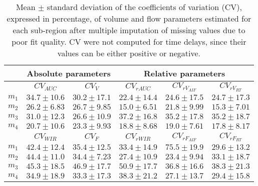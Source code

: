 \begin{table}
\begin{center}
\begin{tabular}{lccccc}
\toprule
& \multicolumn{2}{c}{Absolute parameters} & \multicolumn{3}{c}{Relative parameters} \\
\midrule
 & $CV_{AUC}$  & $CV_{V}$  & $CV_{rAUC}$  & $CV_{rV_{AIF}}$  & $CV_{rV_{RT}}$ \\
\midrule
$m_1$  	& $34.7 \pm 10.6$ 	& $30.2 \pm 17.1$ 	& $22.4 \pm 14.4$ 	& $24.6 \pm 17.5$ 	& $24.7 \pm 17.3$ 	\\
$m_2$  	& $26.2 \pm 6.83$ 	& $26.7 \pm 9.85$ 	& $15.0 \pm 6.51$ 	& $21.8 \pm 9.99$ 	& $15.3 \pm 7.01$ 	\\
$m_3$ 	& $31.0 \pm 12.3$ 	& $26.6 \pm 10.9$ 	& $37.2 \pm 16.8$ 	& $35.2 \pm 17.8$ 	& $35.2 \pm 18.7$ 	\\
$m_4$ 	& $20.7 \pm 10.6$ 	& $23.3 \pm 9.93$ 	& $18.8 \pm 8.68$ 	& $19.0 \pm 7.61$ 	& $17.8 \pm 8.17$ 	\\

\midrule
 & $CV_{WIR}$  & $CV_{F}$  & $CV_{rWIR}$ & $CV_{rF_{AIF}}$ & $CV_{rF_{RT}}$ \\
\midrule
$m_1$ 	& $42.4 \pm 12.4$ 	& $35.4 \pm 12.5$ 	& $33.4 \pm 14.9$ 	& $75.5 \pm 19.9$ 	& $29.6 \pm 13.2$ 	\\
$m_2$ 	& $44.4 \pm 11.0$ 	& $34.4 \pm 7.23$ 	& $27.4 \pm 10.9$ 	& $23.4 \pm 9.94$ 	& $33.1 \pm 18.7$	\\
$m_3$ 	& $45.3 \pm 18.5$ 	& $46.9 \pm 17.7$ 	& $50.9 \pm 17.7$ 	& $36.8 \pm 16.6$ 	& $38.3 \pm 21.3$ 	\\
$m_4$  	& $34.9 \pm 18.9$ 	& $33.3 \pm 17.3$ 	& $38.3 \pm 21.2$ 	& $27.1 \pm 13.7$ 	& $29.4 \pm 15.8$ 	\\

\bottomrule
\end{tabular}
\caption{Mean $\pm$ standard deviation of the coefficients of variation (CV), expressed in percentage, of volume and flow parameters estimated for each sub-region after multiple imputation of missing values due to poor fit quality. CV were not computed for time delays, since their values can be either positive or negative.}
\label{tab:RCV}
\end{center}
\end{table}

